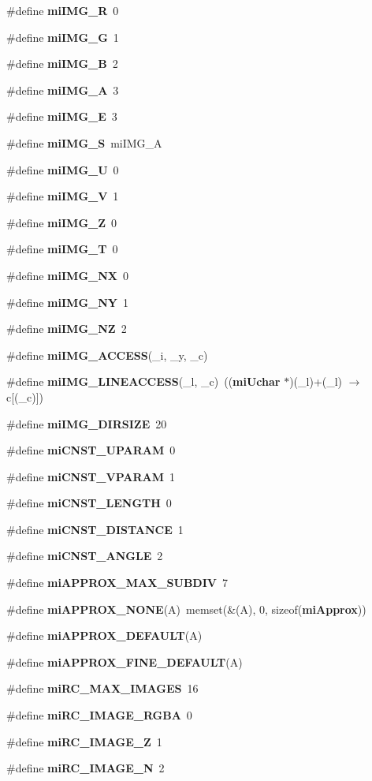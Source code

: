 \begin{CompactItemize}
\item 
\#define {\bf mi\-IMG\_\-R}\ 0
\item 
\#define {\bf mi\-IMG\_\-G}\ 1
\item 
\#define {\bf mi\-IMG\_\-B}\ 2
\item 
\#define {\bf mi\-IMG\_\-A}\ 3
\item 
\#define {\bf mi\-IMG\_\-E}\ 3
\item 
\#define {\bf mi\-IMG\_\-S}\ mi\-IMG\_\-A
\item 
\#define {\bf mi\-IMG\_\-U}\ 0
\item 
\#define {\bf mi\-IMG\_\-V}\ 1
\item 
\#define {\bf mi\-IMG\_\-Z}\ 0
\item 
\#define {\bf mi\-IMG\_\-T}\ 0
\item 
\#define {\bf mi\-IMG\_\-NX}\ 0
\item 
\#define {\bf mi\-IMG\_\-NY}\ 1
\item 
\#define {\bf mi\-IMG\_\-NZ}\ 2
\item 
\#define {\bf mi\-IMG\_\-ACCESS}(\_\-i, \_\-y, \_\-c)
\item 
\#define {\bf mi\-IMG\_\-LINEACCESS}(\_\-l, \_\-c)\ (({\bf mi\-Uchar} $\ast$)(\_\-l)+(\_\-l) $\rightarrow$ c[(\_\-c)])
\item 
\#define {\bf mi\-IMG\_\-DIRSIZE}\ 20
\item 
\#define {\bf mi\-CNST\_\-UPARAM}\ 0
\item 
\#define {\bf mi\-CNST\_\-VPARAM}\ 1
\item 
\#define {\bf mi\-CNST\_\-LENGTH}\ 0
\item 
\#define {\bf mi\-CNST\_\-DISTANCE}\ 1
\item 
\#define {\bf mi\-CNST\_\-ANGLE}\ 2
\item 
\#define {\bf mi\-APPROX\_\-MAX\_\-SUBDIV}\ 7
\item 
\#define {\bf mi\-APPROX\_\-NONE}(A)\ memset(\&(A), 0, sizeof({\bf mi\-Approx}))
\item 
\#define {\bf mi\-APPROX\_\-DEFAULT}(A)
\item 
\#define {\bf mi\-APPROX\_\-FINE\_\-DEFAULT}(A)
\item 
\#define {\bf mi\-RC\_\-MAX\_\-IMAGES}\ 16
\item 
\#define {\bf mi\-RC\_\-IMAGE\_\-RGBA}\ 0
\item 
\#define {\bf mi\-RC\_\-IMAGE\_\-Z}\ 1
\item 
\#define {\bf mi\-RC\_\-IMAGE\_\-N}\ 2
\item 

\end{CompactItemize}

